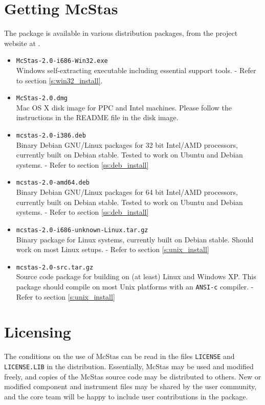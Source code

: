 \label{s:install}

\section{Getting McStas}
\label{s:obtain}
The  package is
available in various distribution packages, from the project
website at
.
\begin{itemize}
\item{\texttt{McStas-2.0-i686-Win32.exe}\\Windows self-extracting executable
    including essential support tools. - Refer to section
    \ref{s:win32_install}. }
\item{\texttt{McStas-2.0.dmg}\\Mac OS X disk image for PPC and Intel machines. Please follow
    the instructions in the README file in the disk image. }
\item{\texttt{mcstas-2.0-i386.deb}\\Binary Debian GNU/Linux packages for 32 bit Intel/AMD processors, currently built on Debian stable.
   Tested to work on Ubuntu and Debian systems.
 - Refer to section \ref{ss:deb_install}}
\item{\texttt{mcstas-2.0-amd64.deb}\\Binary Debian GNU/Linux packages for 64 bit Intel/AMD processors, currently built on Debian stable.
   Tested to work on Ubuntu and Debian systems.
 - Refer to section \ref{ss:deb_install}}
\item{\texttt{mcstas-2.0-i686-unknown-Linux.tar.gz}\\Binary package
  for Linux systems, currently built on Debian stable.
  Should work on most Linux setups.
 - Refer to section \ref{s:unix_install}}
\item{\texttt{mcstas-2.0-src.tar.gz}\\Source code package for
    building  on
    (at least) Linux and Windows XP. This package should compile on
    most Unix platforms with an \texttt{ANSI-c} compiler. - Refer to section \ref{s:unix_install}}
\end{itemize}

\section{Licensing}
The conditions on the use of McStas can be read in the files
\verb+LICENSE+ and \verb+LICENSE.LIB+ in the distribution. Essentially,
McStas may be used and modified freely, and copies of the McStas source code
may be distributed to others.
New or modified component and instrument files may be shared by
the user community, and the core team will be happy to include user contributions in the package.

